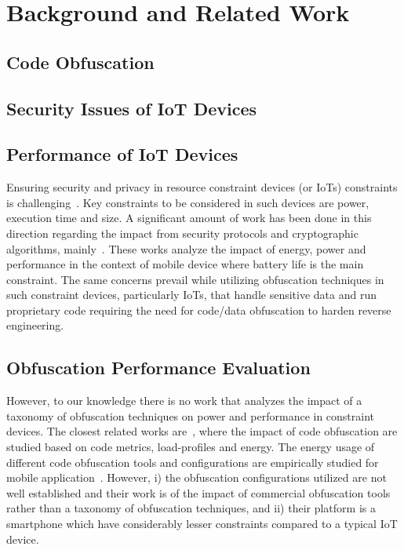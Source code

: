 \section{Background and Related Work}\label{sec:rw}

\subsection{Code Obfuscation}

\subsection{Security Issues of IoT Devices}

\subsection{Performance of IoT Devices}
Ensuring security and privacy in resource constraint devices (or IoTs) constraints is challenging~\cite{7823334, 6970594, 5675772}. Key constraints to be considered in such devices are power, execution time and size. A significant amount of work has been done in this direction regarding the impact from security protocols and cryptographic algorithms, mainly~\cite{potlapally2003analyzing, 5983970, 1347774, 5940923}. These works analyze the impact of energy, power and performance in the context of mobile device where battery life is the main constraint. The same concerns prevail while utilizing obfuscation techniques in such constraint devices, particularly IoTs, that handle sensitive data and run proprietary code requiring the need for code/data obfuscation to harden reverse engineering.

\subsection{Obfuscation Performance Evaluation}
However, to our knowledge there is no work that analyzes the impact of a taxonomy of obfuscation techniques on power and performance in constraint devices. The closest related works are~\cite{6976079, Ceccato, dhukovic2015load}, where the impact of code obfuscation are studied based on code metrics, load-profiles and energy. The energy usage of different code obfuscation tools and configurations are empirically studied for mobile application~\cite{6976079}. However, i) the obfuscation configurations utilized are not well established and their work is of the impact of commercial obfuscation tools rather than a taxonomy of obfuscation techniques, and ii) their platform is a smartphone which have considerably lesser constraints compared to a typical IoT device.

